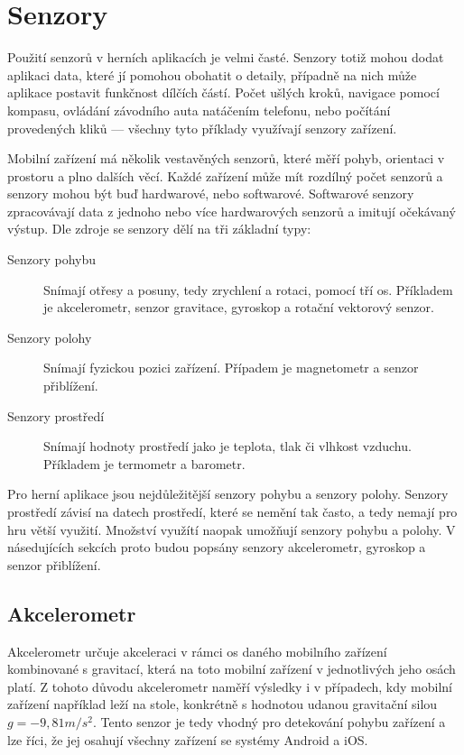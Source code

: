 \section{Senzory}

Použití senzorů v herních aplikacích je velmi časté.
Senzory totiž mohou dodat aplikaci data,
které jí pomohou obohatit o detaily,
případně na nich může aplikace postavit funkčnost dílčích částí.
Počet ušlých kroků,
navigace pomocí kompasu,
ovládání závodního auta natáčením telefonu,
nebo počítání provedených kliků
--- všechny tyto příklady využívají senzory zařízení.
\cite{sensors} 

Mobilní zařízení má několik vestavěných senzorů,
které měří pohyb, orientaci v prostoru a plno dalších věcí.
Každé zařízení může mít rozdílný počet senzorů
a senzory mohou být buď hardwarové, nebo softwarové.
Softwarové senzory zpracovávají data z jednoho nebo více hardwarových senzorů
a imitují očekávaný výstup.
Dle zdroje \cite{sensors} se senzory dělí na tři základní typy:

\begin{description}
    \item[Senzory pohybu] Snímají otřesy a posuny,
    tedy zrychlení a rotaci,
    pomocí tří os.
    Příkladem je akcelerometr, senzor gravitace, gyroskop
    a rotační vektorový senzor.
    \item[Senzory polohy] Snímají fyzickou pozici zařízení.
    Případem je magnetometr a senzor přiblížení.
    \item[Senzory prostředí] Snímají hodnoty prostředí
    jako je teplota, tlak či vlhkost vzduchu.
    Příkladem je termometr a barometr.
\end{description}

Pro herní aplikace jsou nejdůležitější senzory pohybu a senzory polohy.
Senzory prostředí závisí na datech prostředí,
které se nemění tak často,
a tedy nemají pro hru větší využití.
Množství využítí naopak umožňují senzory pohybu a polohy.
\cite{sensors_android}
V násedujících sekcích proto budou popsány senzory akcelerometr, gyroskop
a senzor přiblížení.

\subsection{Akcelerometr}

Akcelerometr určuje akceleraci v rámci os daného mobilního zařízení
kombinované s gravitací,
která na toto mobilní zařízení v jednotlivých jeho osách platí.
Z tohoto důvodu akcelerometr naměří výsledky i v případech,
kdy mobilní zařízení například leží na stole,
konkrétně s hodnotou udanou gravitační silou $g = -9,81 m/s^2$.
\cite{sensors_motion}
Tento senzor je tedy vhodný pro detekování pohybu zařízení
a lze říci, že jej osahují všechny zařízení se systémy Android a iOS.

